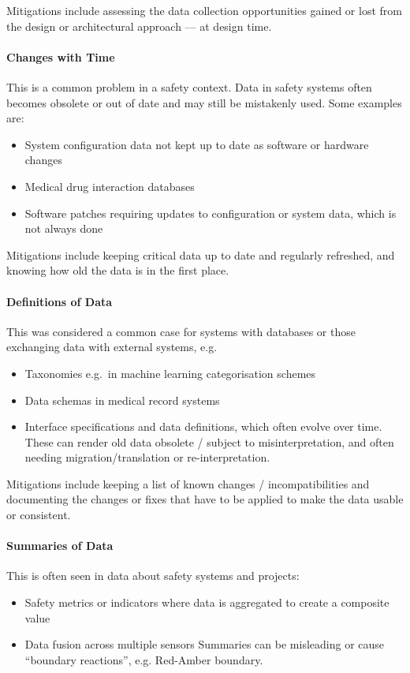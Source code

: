 Mitigations include assessing the data collection opportunities gained or lost from the design or architectural approach --- at design time.

\paragraph{Changes with Time}\label{bkm:dark7}
This is a common problem in a safety context. Data in safety systems often becomes obsolete or out of date and may still be mistakenly used. Some examples are:
\begin{itemize}
\item System \gls{configuration data} not kept up to date as software or hardware changes
  \item Medical drug interaction \glspl{database}
  \item Software patches requiring updates to configuration or system data, which is not always done
\end{itemize}

Mitigations include keeping \gls{critical data} up to date and regularly refreshed, and knowing how old the data is in the first place.

\paragraph{Definitions of Data}\label{bkm:dark8}
This was considered a common case for systems with \glspl{database} or those exchanging data with external systems, e.g.
\begin{itemize}
\item Taxonomies e.g.\ in machine learning categorisation schemes
  \item Data schemas in medical record systems 
  \item Interface specifications and data definitions, which often evolve over time. These can render old data obsolete / subject to misinterpretation, and often needing migration/translation or re-interpretation.
\end{itemize}

Mitigations include keeping a list of known changes / incompatibilities and documenting the changes or fixes that have to be applied to make the data usable or consistent.

\paragraph{Summaries of Data}\label{bkm:dark9}
This is often seen in data about safety systems and projects:
\begin{itemize}
\item Safety metrics or indicators where data is aggregated to create a composite value
  \item Data fusion across multiple sensors
Summaries can be misleading or cause “boundary reactions”, e.g. Red-Amber boundary.
\end{itemize}

